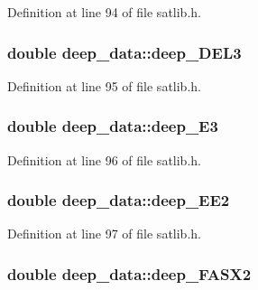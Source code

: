 Definition at line 94 of file satlib.\-h.

\hypertarget{structdeep__data_a1c596e0d8433da1dfb79124550ae55f3}{
\subsubsection[{deep\-\_\-\-D\-E\-L3}]{\setlength{\rightskip}{0pt plus 5cm}double deep\-\_\-data\-::deep\-\_\-\-D\-E\-L3}}\label{structdeep__data_a1c596e0d8433da1dfb79124550ae55f3}


Definition at line 95 of file satlib.\-h.

\hypertarget{structdeep__data_a18bc60bed280f6304b0561e620a0fba1}{
\subsubsection[{deep\-\_\-\-E3}]{\setlength{\rightskip}{0pt plus 5cm}double deep\-\_\-data\-::deep\-\_\-\-E3}}\label{structdeep__data_a18bc60bed280f6304b0561e620a0fba1}


Definition at line 96 of file satlib.\-h.

\hypertarget{structdeep__data_ad56e8a78d8e4b1e77212692466325ea0}{
\subsubsection[{deep\-\_\-\-E\-E2}]{\setlength{\rightskip}{0pt plus 5cm}double deep\-\_\-data\-::deep\-\_\-\-E\-E2}}\label{structdeep__data_ad56e8a78d8e4b1e77212692466325ea0}


Definition at line 97 of file satlib.\-h.

\hypertarget{structdeep__data_a6860682a1c0a1bd96a6da624e58904f2}{
\subsubsection[{deep\-\_\-\-F\-A\-S\-X2}]{\setlength{\rightskip}{0pt plus 5cm}double deep\-\_\-data\-::deep\-\_\-\-F\-A\-S\-X2}}\label{structdeep__data_a6860682a1c0a1bd96a6da624e58904f2}



